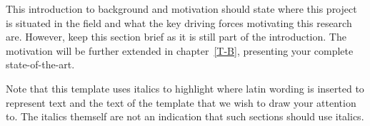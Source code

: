 This introduction to background and motivation should state where this project is situated in the field and what the key driving forces motivating this research are. However, keep this section brief as it is still part of the introduction. The motivation will be further extended in chapter~\ref{T-B}, presenting your complete state-of-the-art. 

Note that this template uses italics to highlight where latin wording is inserted to represent text and the text of the template that we wish to draw your attention to. The italics themself are not an indication that such sections should use italics.  
\fi
